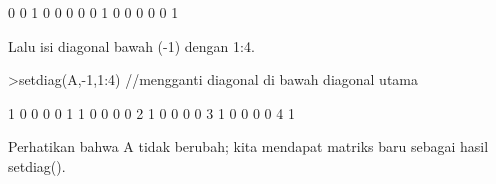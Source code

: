 \documentclass[a4paper,10pt]{article}
\begin{document}
\begin{eulernotebook}
\begin{eulercomment}
\begin{eulercomment}
\begin{eulercomment}
\begin{eulercomment}
\begin{eulercomment}
\begin{eulercomment}
\begin{eulercomment}
\begin{eulercomment}
\begin{eulercomment}
\begin{eulercomment}
\begin{eulercomment}
\begin{eulercomment}
\begin{eulercomment}
\begin{eulercomment}
\begin{euleroutput}
              0             0             1             0             0 
              0             0             0             1             0 
              0             0             0             0             1 
\end{euleroutput}
\begin{eulercomment}
Lalu isi diagonal bawah (-1) dengan 1:4.
\end{eulercomment}
\begin{eulerprompt}
>setdiag(A,-1,1:4) //mengganti diagonal di bawah diagonal utama
\end{eulerprompt}
\begin{euleroutput}
              1             0             0             0             0 
              1             1             0             0             0 
              0             2             1             0             0 
              0             0             3             1             0 
              0             0             0             4             1 
\end{euleroutput}
\begin{eulercomment}
Perhatikan bahwa A tidak berubah; kita mendapat matriks baru sebagai hasil
setdiag().


\end{eulercomment}
\end{eulercomment}
\end{eulercomment}
\end{eulercomment}
\end{eulercomment}
\end{eulercomment}
\end{eulercomment}
\end{eulercomment}
\end{eulercomment}
\end{eulercomment}
\end{eulercomment}
\end{eulercomment}
\end{eulercomment}
\end{eulercomment}
\end{eulercomment}
\end{eulernotebook}
\end{document}
